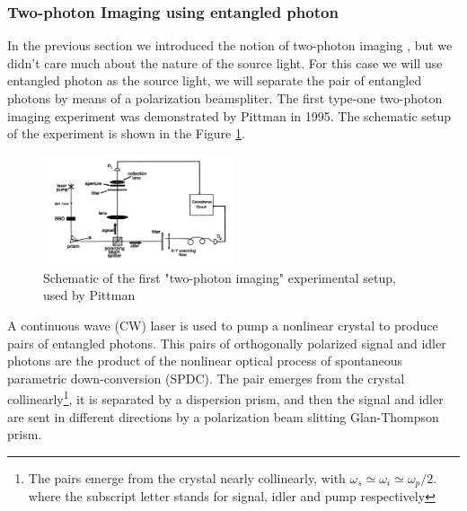 \subsubsection{Two-photon Imaging using entangled photon}

In the previous section we introduced the notion of two-photon imaging , but we didn't care much about the nature of the source light. For this case we will use entangled photon as the source light, we will separate the pair of entangled photons by means of a polarization beamspliter. The first type-one two-photon imaging experiment was demonstrated by Pittman in 1995\cite{pittman}. The schematic setup of the experiment is shown in the Figure \ref{fig:pittman}. \\ 

\begin{figure}[h]
\centering
\includegraphics[width=0.5\textwidth]{Figures/pittman.png}
\caption{Schematic of the first "two-photon imaging" experimental setup, used by Pittman\cite{pittman}} 
\label{fig:pittman}
\end{figure}
A continuous wave (CW) laser is used to pump a nonlinear 
crystal to produce pairs of entangled photons. This pairs of orthogonally polarized signal and idler photons are the product
of the nonlinear optical process of spontaneous parametric down-conversion (SPDC).
The pair emerges from the crystal collinearly\footnote{The pairs emerge from the crystal nearly 
collinearly, with $\omega_s \simeq \omega_i \simeq \omega_p / 2$. where the subscript
letter stands for signal, idler and pump respectively}, it is separated by a dispersion prism, 
and then the signal and idler are sent in different directions by a polarization
beam slitting Glan-Thompson prism. 

